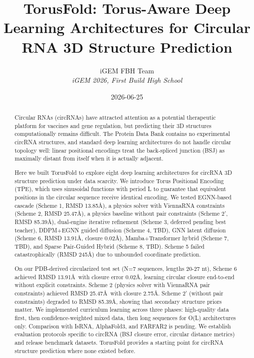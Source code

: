 \documentclass[12pt]{article}
\title{TorusFold: Torus-Aware Deep Learning Architectures for Circular RNA 3D Structure Prediction}
\author{
iGEM FBH Team\\
\textit{iGEM 2026, First Build High School}
}
\date{2026-06-25}
\begin{document}
\maketitle

\begin{abstract}
Circular RNAs (circRNAs) have attracted attention as a potential therapeutic platform for vaccines and gene regulation, but predicting their 3D structures computationally remains difficult. The Protein Data Bank contains no experimental circRNA structures, and standard deep learning architectures do not handle circular topology well: linear positional encodings treat the back-spliced junction (BSJ) as maximally distant from itself when it is actually adjacent.

Here we built TorusFold to explore eight deep learning architectures for circRNA 3D structure prediction under data scarcity. We introduce Torus Positional Encoding (TPE), which uses sinusoidal functions with period L to guarantee that equivalent positions in the circular sequence receive identical encoding. We tested EGNN-based cascade (Scheme 1, RMSD 13.85\AA), a physics solver with ViennaRNA constraints (Scheme 2, RMSD 25.47\AA), a physics baseline without pair constraints (Scheme 2', RMSD 85.39\AA), dual-engine iterative refinement (Scheme 3, deferred pending best teacher), DDPM+EGNN guided diffusion (Scheme 4, TBD), GNN latent diffusion (Scheme 6, RMSD 13.91\AA, closure 0.02\AA), Mamba+Transformer hybrid (Scheme 7, TBD), and Sparse Pair-Guided Hybrid (Scheme 8, TBD). Scheme 5 failed catastrophically (RMSD 245\AA) due to unbounded coordinate prediction.

On our PDB-derived circularized test set (N=7 sequences, lengths 20-27 nt), Scheme 6 achieved RMSD 13.91\AA\ with closure error 0.02\AA, learning circular closure end-to-end without explicit constraints. Scheme 2 (physics solver with ViennaRNA pair constraints) achieved RMSD 25.47\AA\ with closure 2.75\AA. Scheme 2' (without pair constraints) degraded to RMSD 85.39\AA, showing that secondary structure priors matter. We implemented curriculum learning across three phases: high-quality data first, then confidence-weighted mixed data, then long sequences for O(L) architectures only. Comparison with IsRNA, AlphaFold3, and FARFAR2 is pending. We establish evaluation protocols specific to circRNA (BSJ closure error, circular distance metrics) and release benchmark datasets. TorusFold provides a starting point for circRNA structure prediction where none existed before.
\end{abstract}
\end{document}
